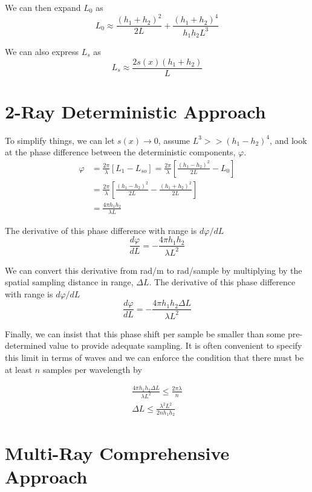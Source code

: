We can then expand $L_0$ as
\begin{equation}
L_0 \approx \frac{(h_1+h_2)^2}{2L} + \frac{(h_1+h_2)^4}{h_1h_2L^3}
\label{mp_eq:6}
\end{equation}

We can also express $L_s$ as
\begin{equation}
L_s \approx \frac{2s(x)(h_1 + h_2)}{L}
\label{mp_eq:6a}
\end{equation}

\section{2-Ray Deterministic Approach}
To simplify things, we can let $s(x) \rightarrow 0$, assume $L^3 >> (h_1 - h_2)^4$, and look at the phase difference between the deterministic components, $\varphi$.
\begin{equation}
\begin{aligned}
\varphi &= \frac{2\pi}{\lambda}\left[L_1 - L_{so}\right] = \frac{2\pi}{\lambda}\left[\frac{(h_1-h_2)^2}{2L} - L_0\right]\\
&= \frac{2\pi}{\lambda}\left[\frac{(h_1-h_2)^2}{2L} - \frac{(h_1+h_2)^2}{2L} \right]\\
&= \frac{4\pi h_1h_2}{\lambda L}
\end{aligned}
\label{mp_eq:7}
\end{equation}
\renewcommand{\baselinestretch}{2} \small\normalsize

The derivative of this phase difference with range is $d\varphi/dL$
\begin{equation}
\frac{d\varphi}{dL}=-\frac{4\pi h_1h_2}{\lambda L^2}
\label{mp_eq:8}
\end{equation}

We can convert this derivative from rad/m to rad/sample by multiplying by the spatial sampling distance in range, $\Delta L$.
The derivative of this phase difference with range is $d\varphi/dL$
\begin{equation}
\frac{d\varphi}{dL}=-\frac{4\pi h_1h_2\Delta L}{\lambda L^2}
\label{mp_eq:9}
\end{equation}

Finally, we can insist that this phase shift per sample be smaller than some pre-determined value to provide adequate sampling. It is often convenient to specify this limit in terms of waves and we can enforce the condition that there must be at least $n$ samples per wavelength by 

\begin{equation}
\begin{gathered}
\frac{4\pi h_1h_2\Delta L}{\lambda L^2} \leq \frac{2\pi \lambda}{n}\\
\Delta L \leq \frac{\lambda^2 L^2}{2nh_1h_2}
\end{gathered}
\label{mp_eq:10}
\end{equation}

\section{Multi-Ray Comprehensive Approach}
